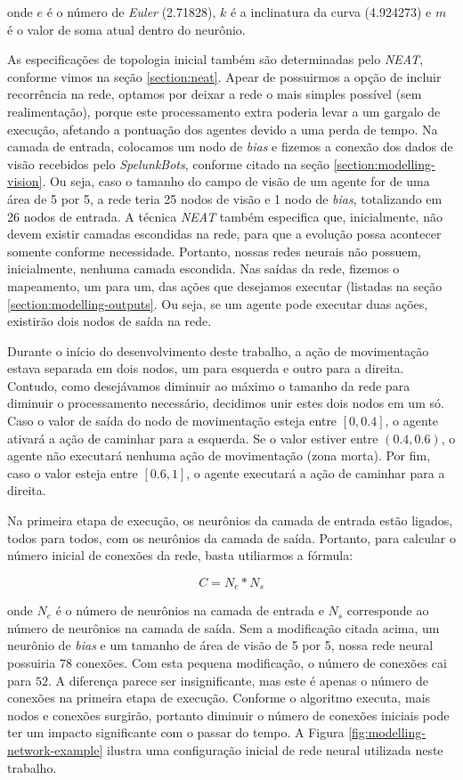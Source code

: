 onde $e$ é o número de \textit{Euler} (2.71828), $k$ é a inclinatura da curva
(4.924273) e $m$ é o valor de soma atual dentro do neurônio.

As especificações de topologia inicial também são determinadas pelo
\textit{NEAT}, conforme vimos na seção \ref{section:neat}. Apear de possuirmos a
opção de incluir recorrência na rede, optamos por deixar a rede o mais simples
possível (sem realimentação), porque este processamento extra poderia levar a um
gargalo de execução, afetando a pontuação dos agentes devido a uma perda de
tempo. Na camada de entrada, colocamos um nodo de \textit{bias} e  fizemos a
conexão dos dados de visão recebidos pelo \textit{SpelunkBots}, conforme citado
na seção \ref{section:modelling-vision}. Ou seja, caso o tamanho do campo de
visão de um agente for de uma área de 5 por 5, a rede teria 25 nodos de visão e
1 nodo de \textit{bias}, totalizando em 26 nodos de entrada. A técnica
\textit{NEAT} também especifica que, inicialmente, não devem existir camadas
escondidas na rede, para que a evolução possa acontecer somente conforme
necessidade. Portanto, nossas redes neurais não possuem, inicialmente, nenhuma
camada escondida. Nas saídas da rede, fizemos o mapeamento, um para um, das
ações que desejamos executar (listadas na seção \ref{section:modelling-outputs}.
Ou seja, se um agente pode executar duas ações, existirão dois nodos de saída na
rede.

Durante o início do desenvolvimento deste trabalho, a ação de movimentação
estava separada em dois nodos, um para esquerda e outro para a direita. Contudo,
como desejávamos diminuir ao máximo o tamanho da rede para diminuir o
processamento necessário, decidimos unir estes dois nodos em um só. Caso o valor
de saída do nodo de movimentação esteja entre $[0,0.4]$, o agente ativará a ação
de caminhar para a esquerda. Se o valor estiver entre $(0.4,0.6)$, o agente não
executará nenhuma ação de movimentação (zona morta). Por fim, caso o valor
esteja entre $[0.6,1]$, o agente executará a ação de caminhar para a direita.

Na primeira etapa de execução, os neurônios da camada de entrada estão ligados,
todos para todos, com os neurônios da camada de saída. Portanto, para calcular o
número inicial de conexões da rede, basta utiliarmos a fórmula:

\begin{equation}
	\label{eq:network-connections}
	C = N_e * N_s
\end{equation}

onde $N_e$ é o número de neurônios na camada de entrada e $N_s$ corresponde ao
número de neurônios na camada de saída. Sem a modificação citada acima, um
neurônio de \textit{bias} e um tamanho de área de visão de 5 por 5, nossa rede
neural possuiria $78$ conexões.  Com esta pequena modificação, o número de
conexões cai para $52$. A diferença parece ser insignificante, mas este é apenas
o número de conexões na primeira etapa de execução. Conforme o algoritmo
executa, mais nodos e conexões surgirão, portanto diminuir o número de conexões
iniciais pode ter um impacto significante com o passar do tempo. A Figura
\ref{fig:modelling-network-example} ilustra uma configuração inicial de rede
neural utilizada neste trabalho.

